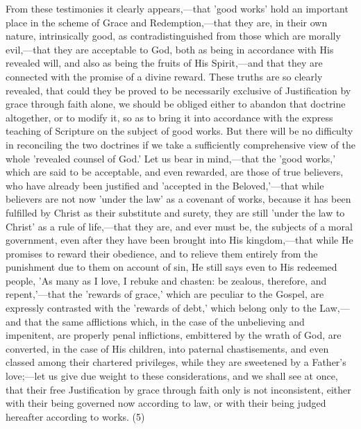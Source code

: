 \documentclass[
]{book}
\begin{document}
From these testimonies it clearly appears,---that 'good works' hold an important place in the scheme of Grace and Redemption,---that they are, in their own nature, intrinsically good, as contradistinguished from those which are morally evil,---that they are acceptable to God, both as being in accordance with His revealed will, and also as being the fruits of His Spirit,---and that they are connected with the promise of a divine reward. These truths are so clearly revealed, that could they be proved to be necessarily exclusive of Justification by grace through faith alone, we should be obliged either to abandon that doctrine altogether, or to modify it, so as to bring it into accordance with the express teaching of Scripture on the subject of good works. But there will be no difficulty in reconciling the two doctrines if we take a sufficiently comprehensive view of the whole 'revealed counsel of God.' Let us bear in mind,---that the 'good works,' which are said to be acceptable, and even rewarded, are those of true believers, who have already been justified and 'accepted in the Beloved,'---that while believers are not now 'under the law' as a covenant of works, because it has been fulfilled by Christ as their substitute and surety, they are still 'under the law to Christ' as a rule of life,---that they are, and ever must be, the subjects of a moral government, even after they have been brought into His kingdom,---that while He promises to reward their obedience, and to relieve them entirely from the punishment due to them on account of sin, He still says even to His redeemed people, 'As many as I love, I rebuke and chasten: be zealous, therefore, and repent,'---that the 'rewards of grace,' which are peculiar to the Gospel, are expressly contrasted with the 'rewards of debt,' which belong only to the Law,---and that the same afflictions which, in the case of the unbelieving and impenitent, are properly penal inflictions, embittered by the wrath of God, are converted, in the case of His children, into paternal chastisements, and even classed among their chartered privileges, while they are sweetened by a Father's love;---let us give due weight to these considerations, and we shall see at once, that their free Justification by grace through faith only is not inconsistent, either with their being governed now according to law, or with their being judged hereafter according to works. (5)
\end{document}
